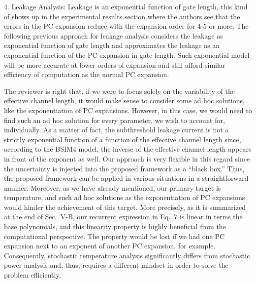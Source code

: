 \begin{reviewer}
4. Leakage Analysis: Leakage is an exponential function of gate length, this kind of shows up in the experimental results section where the authors see that the errors in the PC expansion reduce with the expansion order for 4-5 or more. The following previous approach for leakage analysis considers the leakage as exponential function of gate length and approximates the leakage as an exponential function of the PC expansion in gate length. Such exponential model will be more accurate at lower orders of expansion and still afford similar efficiency of computation as the normal PC expansion.
\end{reviewer}
\begin{authors}
The reviewer is right that, if we were to focus solely on the variability of the effective channel length, it would make sense to consider some ad hoc solutions, like the exponentiation of PC expansions.
However, in this case, we would need to find such an ad hoc solution for every parameter, we wish to account for, individually.
As a matter of fact, the subthreshold leakage current is not a strictly exponential function of a function of the effective channel length since, according to the BSIM4 model, the inverse of the effective channel length appears in front of the exponent as well.
Our approach is very flexible in this regard since the uncertainty is injected into the proposed framework as a ``black box.''
Thus, the proposed framework can be applied in various situations in a straightforward manner.
Moreover, as we have already mentioned, our primary target is temperature, and such ad hoc solutions as the exponentiation of PC expansions would hinder the achievement of this target.
More precisely, as it is summarized at the end of Sec.~V-B, our recurrent expression in Eq.~7 is linear in terms the base polynomials, and this linearity property is highly beneficial from the computational perspective.
The property would be lost if we had one PC expansion next to an exponent of another PC expansion, for example.
Consequently, stochastic temperature analysis significantly differs from stochastic power analysis and, thus, requires a different mindset in order to solve the problem efficiently.

\end{authors}

